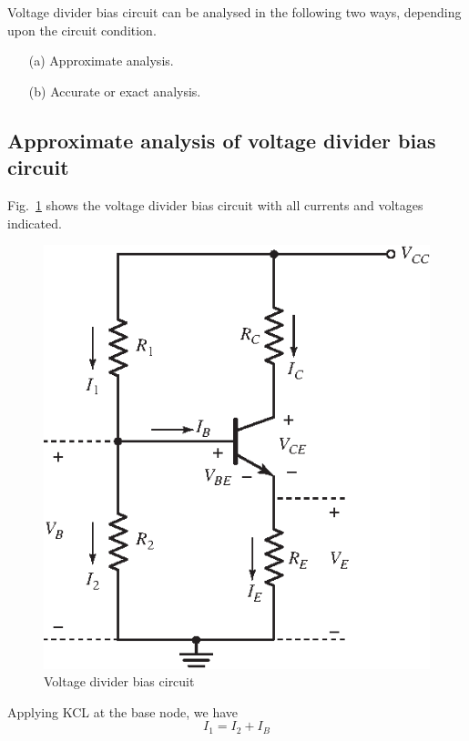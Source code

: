 Voltage divider bias circuit can be analysed in the following two ways, depending upon the circuit condition.
\begin{itemize}
\item[(a)] Approximate analysis.

\item[(b)] Accurate or exact analysis.
\end{itemize}

\subsection{Approximate analysis of voltage divider bias circuit}\label{sec4.7.1}


Fig.~\ref{fig4.12} shows the voltage divider bias circuit with all currents and voltages indicated.
\begin{figure}[H]
\centering
\includegraphics[scale=1.05]{chap3/S3-EE-03-045.eps}
\caption{Voltage divider bias circuit}\label{fig4.12}
\end{figure}

Applying KCL at the base node, we have
\begin{equation}
I_{1}=I_{2}+I_{B}\label{eq4.18}
\end{equation}


